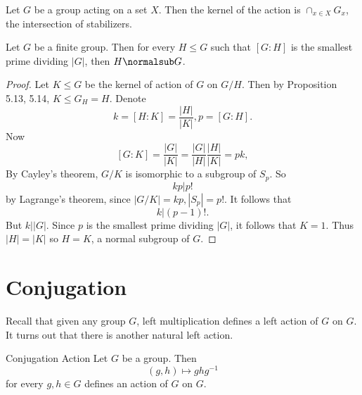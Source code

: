 \documentclass[pmath347]{subfiles}
\begin{document}
    \begin{prop}{}
        Let $G$ be a group acting on a set $X$. Then the kernel of the action is $\cap_{x\in X}G_x$, the intersection of stabilizers.
    \end{prop}

    \begin{theorem}{}
        Let $G$ be a finite group. Then for every $H\leq G$ such that $\left[ G:H \right] $ is the smallest prime dividing $\left| G \right|$, then $H\normalsub G$.
    \end{theorem}

    \begin{proof}
        Let $K\leq G$ be the kernel of action of $G$ on $G /H$. Then by Proposition 5.13, 5.14, $K\leq G_H = H$. Denote
        \begin{equation*}
            k = \left[ H:K \right] = \frac{\left| H \right| }{\left| K \right| }, p = \left[ G:H \right] .
        \end{equation*}
        Now
        \begin{equation*}
            \left[ G:K \right] = \frac{\left| G \right| }{\left| K \right| } = \frac{\left| G \right| }{\left| H \right| }\frac{\left| H \right| }{\left| K \right| }= pk,
        \end{equation*}
        By Cayley's theorem, $G /K$ is isomorphic to a subgroup of $S_p$. So
        \begin{equation*}
            kp | p!
        \end{equation*}
        by Lagrange's theorem, since $\left| G /K \right| = kp, \left| S_p \right| = p!$. It follows that
        \begin{equation*}
            k|\left( p-1 \right) !.
        \end{equation*}
        But $k|\left| G \right|$. Since $p$ is the smallest prime dividing $\left| G \right|$, it follows that $K=1$. Thus $\left| H \right| = \left| K \right|$ so $H=K$, a normal subgroup of $G$.
    \end{proof}

    \section{Conjugation}
    
    \np Recall that given any group $G$, left multiplication defines a left action of $G$ on $G$. It turns out that there is another natural left action.

    \clearpage
    \begin{prop}{Conjugation Action}
        Let $G$ be a group. Then
        \begin{equation*}
            \left( g,h \right) \mapsto ghg^{-1} 
        \end{equation*}
        for every $g,h\in G$ defines an action of $G$ on $G$.
    \end{prop}
\end{document}
